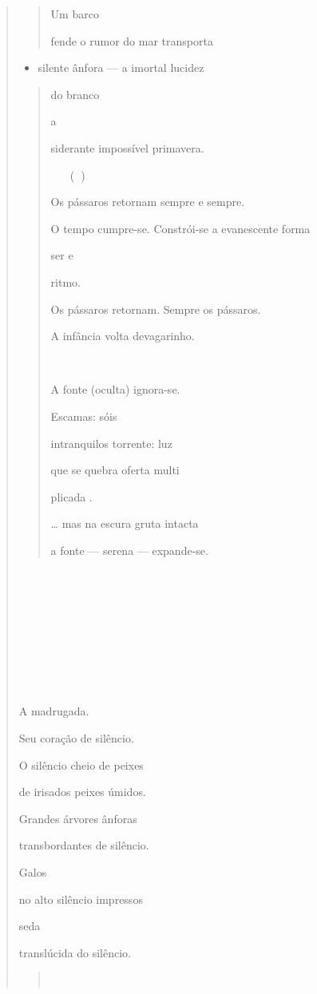 \begin{verse}
\begin{quote}
Um barco

fende o rumor do mar transporta
\end{quote}

\begin{itemize}
\item
  silente ânfora --- a imortal lucidez
\end{itemize}

\begin{quote}
do branco

a

siderante impossível primavera.

 ()

Os pássaros retornam sempre e sempre.

O tempo cumpre-se. Constrói-se a evanescente forma

ser e

ritmo.

Os pássaros retornam. Sempre os pássaros.

A infância volta devagarinho.



A fonte (oculta) ignora-se.

Escamas: sóis

intranquilos torrente: luz

que se quebra oferta multi

plicada .

\ldots{} mas na escura gruta intacta

a fonte --- serena --- expande-se.
\end{quote}











A madrugada.

Seu coração de silêncio.

O silêncio cheio de peixes

de irisados peixes úmidos.

Grandes árvores ânforas

transbordantes de silêncio.

Galos

no alto silêncio impressos

seda

translúcida do silêncio.

\begin{quote}



\end{quote}
\end{verse}
